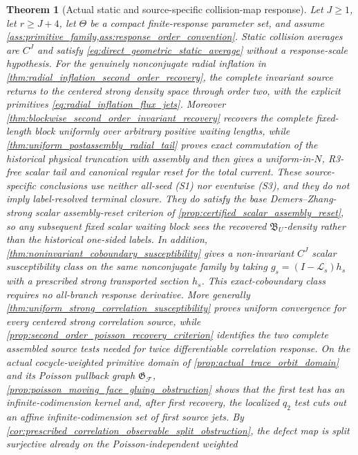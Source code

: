 \documentclass[11pt]{amsart}
\theoremstyle{compactplain}
\newtheorem{theorem}{Theorem}[section]
\theoremstyle{compactdefinition}
\theoremstyle{compactremark}
\newcommand{\Ltransfer}{\mathscr L}
\newcommand{\Thetacal}{\Theta}
\begin{document}
\begin{theorem}[Actual static and source-specific collision-map response]
\label{thm:main_response_package}
Let \(J\ge1\), let \(r\ge J+4\), let \(\Thetacal\) be a compact
finite-response parameter set, and assume
\cref{ass:primitive_family,ass:response_order_convention}.  Static collision
averages are \(C^J\) and satisfy
\eqref{eq:direct_geometric_static_average} without a response-scale hypothesis.
For the genuinely nonconjugate radial inflation in
\cref{thm:radial_inflation_second_order_recovery}, the complete invariant
source returns to the centered strong density space through order two, with
the explicit primitives \eqref{eq:radial_inflation_flux_jets}.  Moreover
\cref{thm:blockwise_second_order_invariant_recovery} recovers the complete
fixed-length block uniformly over arbitrary positive waiting lengths, while
\cref{thm:uniform_postassembly_radial_tail} proves exact commutation of the
historical physical truncation with assembly and then gives a uniform-in-\(N\),
R3-free scalar tail and canonical regular reset for the total current.
These
source-specific conclusions use neither
all-seed (S1) nor eventwise (S3), and they do not imply label-resolved terminal
closure.  They do satisfy the base Demers--Zhang-strong scalar
assembly-reset criterion of
\cref{prop:certified_scalar_assembly_reset}, so any subsequent fixed scalar
waiting block sees the recovered \(\mathfrak B_U\)-density rather than the historical
one-sided labels.
In addition, \cref{thm:noninvariant_coboundary_susceptibility} gives a
non-invariant \(C^J\) scalar susceptibility class on the same nonconjugate
family by taking \(g_s=(I-\Ltransfer_s)h_s\) with a prescribed strong
transported section \(h_s\).  This exact-coboundary class requires no
all-branch response derivative.  More generally
\cref{thm:uniform_strong_correlation_susceptibility} proves uniform convergence
for every centered strong correlation source, while
\cref{prop:second_order_poisson_recovery_criterion} identifies the two
complete assembled source tests needed for twice differentiable correlation
response.  On the actual cocycle-weighted primitive domain of
\cref{prop:actual_trace_orbit_domain} and its Poisson pullback graph
\(\mathfrak G_{\mathscr F}\),
\cref{prop:poisson_moving_face_gluing_obstruction} shows that the
first test has an infinite-codimension kernel and, after first recovery, the
localized \(q_2\) test cuts out an affine infinite-codimension set of first
source jets.  By
\cref{cor:prescribed_correlation_observable_split_obstruction}, the defect map
is split surjective already on the Poisson-independent weighted

\end{theorem}
\end{document}
